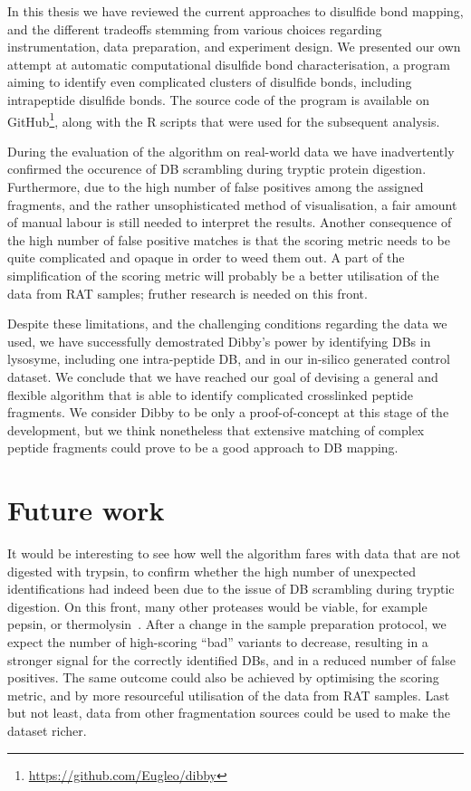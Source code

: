 
In this thesis we have reviewed the current approaches to disulfide bond mapping, and the different tradeoffs stemming from various choices regarding instrumentation, data preparation, and experiment design. We presented our own attempt at automatic computational disulfide bond characterisation, a program aiming to identify even complicated clusters of disulfide bonds, including intrapeptide disulfide bonds. The source code of the program is available on GitHub\footnote{\url{https://github.com/Eugleo/dibby}}, along with the R scripts that were used for the subsequent analysis.

During the evaluation of the algorithm on real-world data we have inadvertently confirmed the occurence of DB scrambling during tryptic protein digestion. Furthermore, due to the high number of false positives among the assigned fragments, and the rather unsophisticated method of visualisation, a fair amount of manual labour is still needed to interpret the results. Another consequence of the high number of false positive matches is that the scoring metric needs to be quite complicated and opaque in order to weed them out. A part of the simplification of the scoring metric will probably be a better utilisation of the data from RAT samples; fruther research is needed on this front.

Despite these limitations, and the challenging conditions regarding the data we used, we have successfully demostrated Dibby's power by identifying DBs in lysosyme, including one intra-peptide DB, and in our in-silico generated control dataset. We conclude that we have reached our goal of devising a general and flexible algorithm that is able to identify complicated crosslinked peptide fragments. We consider Dibby to be only a proof-of-concept at this stage of the development, but we think nonetheless that extensive matching of complex peptide fragments could prove to be a good approach to DB mapping.

\section*{Future work}

It would be interesting to see how well the algorithm fares with data that are not digested with trypsin, to confirm whether the high number of unexpected identifications had indeed been due to the issue of DB scrambling during tryptic digestion. On this front, many other proteases would be viable, for example pepsin, or thermolysin~\cite{sung2016evaluation}. After a change in the sample preparation protocol, we expect the number of high-scoring ``bad'' variants to decrease, resulting in a stronger signal for the correctly identified DBs, and in a reduced number of false positives. The same outcome could also be achieved by optimising the scoring metric, and by more resourceful utilisation of the data from RAT samples. Last but not least, data from other fragmentation sources could be used to make the dataset richer.

